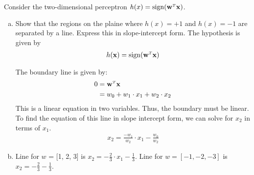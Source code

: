 \documentclass[10pt]{article}
\newcommand{\BF}[1]{\mathbf{#1}}
\newcommand{\RM}[1]{\mathrm{#1}}
\newcommand{\T}{{\mathsmaller T}}
\newenvironment{problem}[2][Problem]{\begin{trivlist}
\item[\hskip \labelsep {\bfseries #1}\hskip \labelsep {\bfseries #2.}]}{\end{trivlist}}
\begin{document}
\begin{problem}{1.2} Consider the two-dimensional perceptron
  $h(x) = \mathrm{sign}(\mathbf{w}^{\mathsmaller T} \mathbf{x})$.
  \begin{enumerate}[a)]
  \item Show that the regions on the plaine where $h(x) = +1$ and
    $h(x) = -1$ are separated by a line. Express this in
    slope-intercept form.  The hypothesis is given by
    \begin{align*}
      h(\BF{x}) = \RM{sign}(\BF{w}^\T \BF{x})
    \end{align*}

    The boundary line is given by:
    \begin{align*}
      0 &= \BF{w}^\T \BF{x} \\
        &= w_0 + w_1 \cdot x_1 + w_2 \cdot x_2
    \end{align*}
    This is a linear equation in two variables. Thus, the boundary must be linear. To find
    the equation of this line in slope intercept form, we can solve for $x_2$ in terms of $x_1$.
    \begin{align*}
      x_2 = \frac{-w_1}{w_2}\cdot x_1 - \frac{w_0}{w_2}
    \end{align*}

  \item Line for $w$ = [1, 2, 3] is
    $x_2 = -\frac{2}{3} \cdot x_1 - \frac{1}{3}$. Line for
    $w = [-1, -2, -3]$ is $x_2 = -\frac{2}{3} - \frac{1}{3}$.
  \end{enumerate}
\end{problem}
\end{document}

